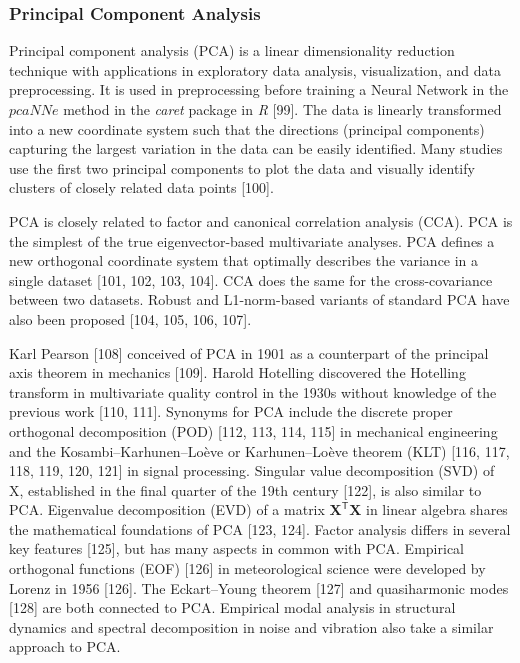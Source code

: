 \documentclass[sn-mathphys-num]{sn-jnl}%
\begin{document}
\subsubsection{Principal Component Analysis}

Principal component analysis (PCA) is a linear dimensionality reduction technique with applications in exploratory data analysis, visualization, and data preprocessing. It is used in preprocessing before training a Neural Network in the $pcaNNe$ method in the \textit{caret} package in \textit{R} [99]. The data is linearly transformed into a new coordinate system such that the directions (principal components) capturing the largest variation in the data can be easily identified. Many studies use the first two principal components to plot the data and visually identify clusters of closely related data points [100].

PCA is closely related to factor and canonical correlation analysis (CCA). PCA is the simplest of the true eigenvector-based multivariate analyses. PCA defines a new orthogonal coordinate system that optimally describes the variance in a single dataset [101, 102, 103, 104]. CCA does the same for the cross-covariance between two datasets. Robust and L1-norm-based variants of standard PCA have also been proposed [104, 105, 106, 107].

Karl Pearson [108] conceived of PCA in 1901 as a counterpart of the principal axis theorem in mechanics [109]. Harold Hotelling discovered the Hotelling transform in multivariate quality control in the 1930s without knowledge of the previous work [110, 111]. Synonyms for PCA include the discrete proper orthogonal decomposition (POD) [112, 113, 114, 115] in mechanical engineering and the Kosambi–Karhunen–Loève or Karhunen–Loève theorem (KLT) [116, 117, 118, 119, 120, 121] in signal processing. Singular value decomposition (SVD) of X, established in the final quarter of the 19th century [122], is also similar to PCA. Eigenvalue decomposition (EVD) of a matrix $\mathbf{X}^{\mathsf{T}}\mathbf{X}$ in linear algebra shares the mathematical foundations of PCA [123, 124]. Factor analysis differs in several key features [125], but has many aspects in common with PCA. Empirical orthogonal functions (EOF) [126] in meteorological science were developed by Lorenz in 1956 [126]. The Eckart–Young theorem [127] and quasiharmonic modes [128] are both connected to PCA. Empirical modal analysis in structural dynamics and spectral decomposition in noise and vibration also take a similar approach to PCA.
\end{document}
